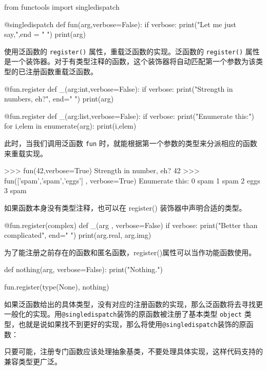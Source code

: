 \begin{python}
from functools import singledispatch

@singledispatch
def fun(arg,verbose=False):
    if verbose:
        print("Let me just say,",end = " ")
    print(arg)
\end{python}

使用泛函数的 \texttt{register()} 属性，重载泛函数的实现。泛函数的 \texttt{register()} 属性是一个装饰器。对于有类型注释的函数，这个装饰器将自动匹配第一个参数为该类型的已注册函数重载泛函数。

\begin{python}
@fun.register
def _(arg:int,verbose=False):
    if verbose:
        print("Strength in numbers, eh?", end=" ")
    print(arg)

@fun.register
def _(arg:list,verbose=False):
    if verbose:
        print("Enumerate this:")
    for i,elem in enumerate(arg):
        print(i,elem)
\end{python}

此时，当我们调用泛函数 \texttt{fun} 时，就能根据第一个参数的类型来分派相应的函数来重载实现。

\begin{python}
>>> fun(42,verbose=True)
Strength in number, eh? 42
>>> fun(['spam','spam','eggs'] , verbose=True)
Enumerate this:
0 spam
1 spam
2 eggs
3 spam
\end{python}

如果函数本身没有类型注释，也可以在 register() 装饰器中声明合适的类型。

\begin{python}
@fun.register(complex)
def _(arg , verbose=False)
    if verbose:
        print("Better than complicated", end=" ")
    print(arg.real, arg.img)
\end{python}

为了能注册之前存在的函数和匿名函数，register()属性可以当作功能函数使用。

\begin{python}
def nothing(arg, verbose=False):
print("Nothing.")
    
fun.register(type(None), nothing)
\end{python}

如果泛函数给出的具体类型，没有对应的注册函数的实现，那么泛函数将去寻找更一般化的实现。用\texttt{@singledispatch}装饰的原函数被注册了基本类型 \texttt{object} 类型，也就是说如果找不到更好的实现，那么将使用\texttt{@singledispatch}装饰的原函数：

只要可能，注册专门函数应该处理抽象基类，不要处理具体实现，这样代码支持的兼容类型更广泛。

